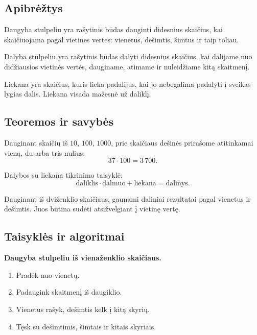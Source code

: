 \subsection{Apibrėžtys}

\begin{apibreztis}
Daugyba stulpeliu yra rašytinis būdas dauginti didesnius skaičius, kai skaičiuojama pagal vietines vertes: vienetus, dešimtis, šimtus ir taip toliau.
\end{apibreztis}

\begin{apibreztis}
Dalyba stulpeliu yra rašytinis būdas dalyti didesnius skaičius, kai dalijame nuo didžiausios vietinės vertės, dauginame, atimame ir nuleidžiame kitą skaitmenį.
\end{apibreztis}

\begin{apibreztis}
Liekana yra skaičius, kuris lieka padalijus, kai jo nebegalima padalyti į sveikas lygias dalis. Liekana visada mažesnė už daliklį.
\end{apibreztis}

\subsection{Teoremos ir savybės}

\begin{savybe}
Dauginant skaičių iš \(10\), \(100\), \(1000\), prie skaičiaus dešinės prirašome atitinkamai vieną, du arba tris nulius:
\[
37\cdot100=3\,700.
\]
\end{savybe}

\begin{savybe}
Dalybos su liekana tikrinimo taisyklė:
\[
\text{daliklis}\cdot\text{dalmuo}+\text{liekana}=\text{dalinys}.
\]
\end{savybe}

\begin{savybe}
Dauginant iš dviženklio skaičiaus, gaunami daliniai rezultatai pagal vienetus ir dešimtis. Juos būtina sudėti atsižvelgiant į vietinę vertę.
\end{savybe}

\subsection{Taisyklės ir algoritmai}

\textbf{Daugyba stulpeliu iš vienaženklio skaičiaus.}
\begin{enumerate}[label=\arabic*.]
\item Pradėk nuo vienetų.
\item Padaugink skaitmenį iš daugiklio.
\item Vienetus rašyk, dešimtis kelk į kitą skyrių.
\item Tęsk su dešimtimis, šimtais ir kitais skyriais.
\end{enumerate}

